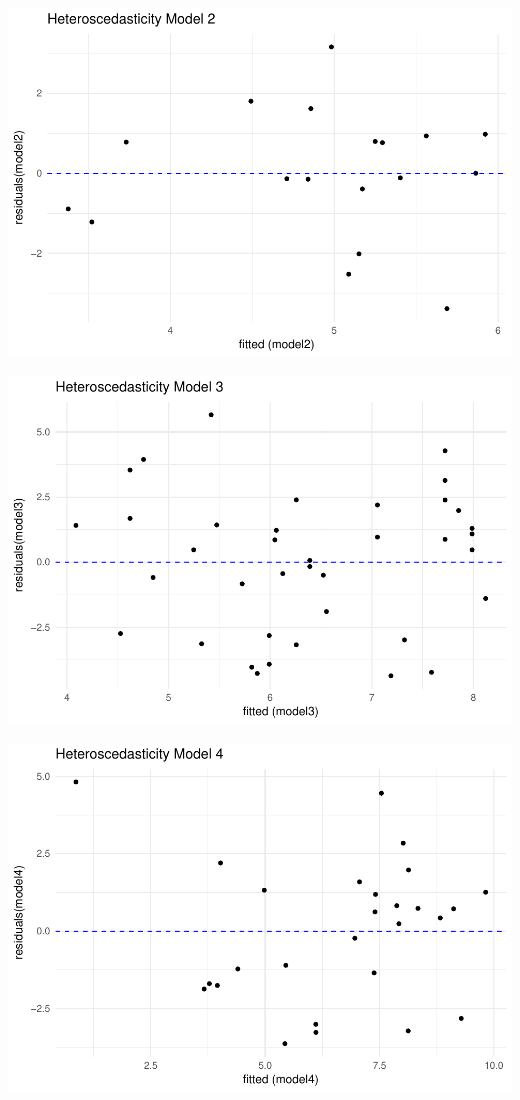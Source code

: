 \documentclass[]{elsarticle} %
\makeatletter
\def\maxwidth{\ifdim\Gin@nat@width>\linewidth\linewidth
\else\Gin@nat@width\fi}
\let\Oldincludegraphics\includegraphics
\renewcommand{\includegraphics}[1]{\Oldincludegraphics[width=\maxwidth]{#1}}
\makeatother
\begin{document}
\includegraphics{stephanie-moura-rmarkdown-tf-ad-ufpe-2018_files/figure-latex/ggplot_model_2-1.pdf}

\includegraphics{stephanie-moura-rmarkdown-tf-ad-ufpe-2018_files/figure-latex/ggplot_model_3-1.pdf}

\includegraphics{stephanie-moura-rmarkdown-tf-ad-ufpe-2018_files/figure-latex/ggplot_model_4-1.pdf}
\end{document}
